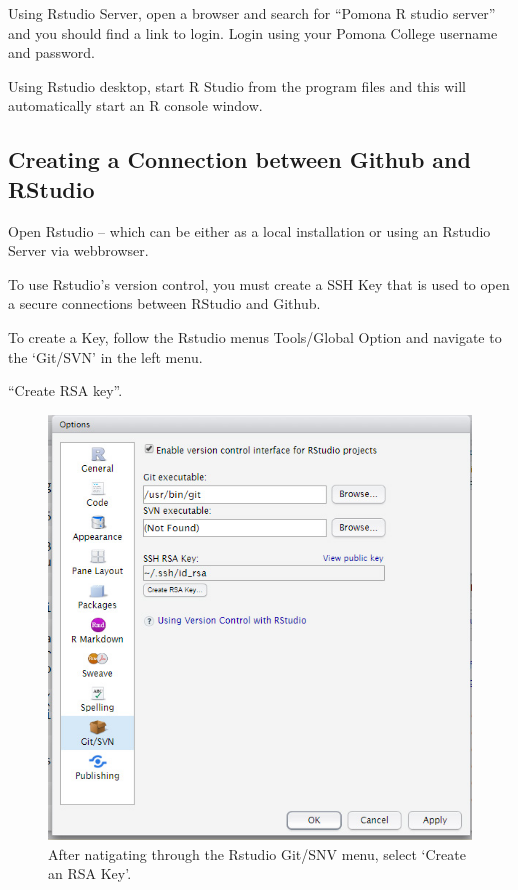 \documentclass[12pt]{../SOP3_beta}
\begin{document}
\NP Using Rstudio Server, open a browser and search for ``Pomona R studio server'' and you should find a link to login. Login using your Pomona College username and password.

\NP Using Rstudio desktop, start R Studio from the program files and this will automatically start an R console window.

\subsection{Creating a Connection between Github and RStudio}

\NP Open Rstudio -- which can be either as a local installation or using an Rstudio Server via webbrowser.

\NP To use Rstudio's version control, you must create a SSH Key that is used to open a secure connections between RStudio and Github.

\NP To create a Key, follow the Rstudio menus Tools/Global Option and navigate to the `Git/SVN' in the left menu.

\NP ``Create RSA key''. 

\begin{figure}
\includegraphics{graphics/CreatingSSH.jpg}
\caption{After natigating through the Rstudio Git/SNV menu, select `Create an RSA Key'.}
\end{figure}
\end{document}

